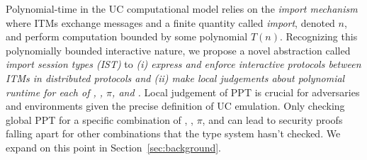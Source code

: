 %

Polynomial-time in the UC computational model relies on the \emph{import mechanism} where ITMs exchange messages and a finite quantity called \emph{import}, denoted $n$, and perform computation bounded by some polynomial $T(n)$.
Recognizing this polynomially bounded interactive nature, we propose a novel abstraction called \emph{import session types (IST)} to \emph{(i) express and enforce interactive protocols between ITMs in distributed protocols and (ii) make local judgements about polynomial runtime for each of \A, \F, $\pi$, and \Z.} 
Local judgement of PPT is crucial for adversaries and environments given the precise definition of UC emulation. Only checking global PPT for a specific combination of \Z, \A, $\pi$, and \F can lead to security proofs falling apart for other combinations that the type system hasn't checked. We expand on this point in Section~\ref{sec:background}.


